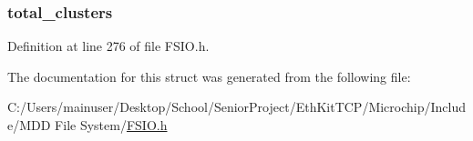 \subsubsection[{total\+\_\+clusters}]{ total\+\_\+clusters}\label{struct_f_s___d_i_s_k___p_r_o_p_e_r_t_i_e_s_a738bb3fda21f00fd49f255a542ed017d}


Definition at line 276 of file F\+S\+I\+O.\+h.



The documentation for this struct was generated from the following file\+:\begin{DoxyCompactItemize}
\item 
C\+:/\+Users/mainuser/\+Desktop/\+School/\+Senior\+Project/\+Eth\+Kit\+T\+C\+P/\+Microchip/\+Include/\+M\+D\+D File System/\hyperlink{_f_s_i_o_8h}{F\+S\+I\+O.\+h}\end{DoxyCompactItemize}
